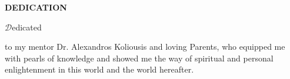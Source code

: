 

\vspace{0.7cm}
\begin{center}
{\fontsize{16}{15} \bf DEDICATION}\\
\end{center}

\vspace{1cm}
\begin{center}
  \large{ { {\Huge $\mathcal{D}$}edicated

	to my mentor Dr. Alexandros Koliousis and loving Parents, who equipped me with pearls of knowledge and showed me the way of spiritual and personal enlightenment in this world and the world hereafter. \\
      } }
\end{center}
\clearpage
\newpage
